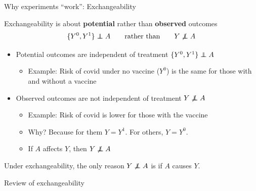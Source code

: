\documentclass{beamer}
\def\independenT#1#2{\mathrel{\rlap{$#1#2$}\mkern2mu{#1#2}}}
\newcommand\indep{\protect\mathpalette{\protect\independenT}{\perp}}
\begin{document}

\begin{frame}{Why experiments ``work'': Exchangeability}

Exchangeability is about \textbf{potential} rather than \textbf{observed} outcomes
$$\{Y^0,Y^1\}\indep A\qquad\text{rather than}\qquad Y\not\indep A$$
 \pause
\begin{itemize}
\item Potential outcomes are independent of treatment $\{Y^0,Y^1\}\indep A$
\begin{itemize}
\item Example: Risk of covid under no vaccine ($Y^0$) is the same for those with and without a vaccine
\end{itemize} \pause
\item Observed outcomes are not independent of treatment $Y\not\indep A$
\begin{itemize}
\item Example: Risk of covid is lower for those with the vaccine
\item Why? Because for them $Y = Y^1$. For others, $Y = Y^0$.
\item If $A$ affects $Y$, then $Y\not\indep A$
\end{itemize}
\end{itemize} \pause
Under exchangeability, the only reason $Y\not\indep A$ is if $A$ causes $Y$.
\end{frame}

\begin{frame}
\huge
Review of exchangeability
\end{frame}
\end{document}

